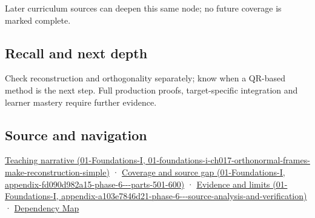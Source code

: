 Later curriculum sources can deepen this same node; no future coverage is marked complete.

\subsection{Recall and next depth}\label{appendix-c39f1ed34271-recall-and-next-depth}

Check reconstruction and orthogonality separately; know when a QR-based method is the next step. Full production proofs, target-specific integration and learner mastery require further evidence.

\subsection{Source and navigation}\label{appendix-c39f1ed34271-source-and-navigation}

\href{../01-Foundations-I/main.pdf\#nameddest=01-foundations-i-ch017-orthonormal-frames-make-reconstruction-simple}{Teaching narrative (01-Foundations-I, 01-foundations-i-ch017-orthonormal-frames-make-reconstruction-simple)} · \href{../01-Foundations-I/main.pdf\#nameddest=appendix-fd090d982a15-phase-6---parts-501-600}{Coverage and source gap (01-Foundations-I, appendix-fd090d982a15-phase-6-\/-\/-parts-501-600)} · \href{../01-Foundations-I/main.pdf\#nameddest=appendix-a103e7846d21-phase-6---source-analysis-and-verification}{Evidence and limits (01-Foundations-I, appendix-a103e7846d21-phase-6-\/-\/-source-analysis-and-verification)} · \hyperref[appendix-4ad47bdd269a]{Dependency Map}
